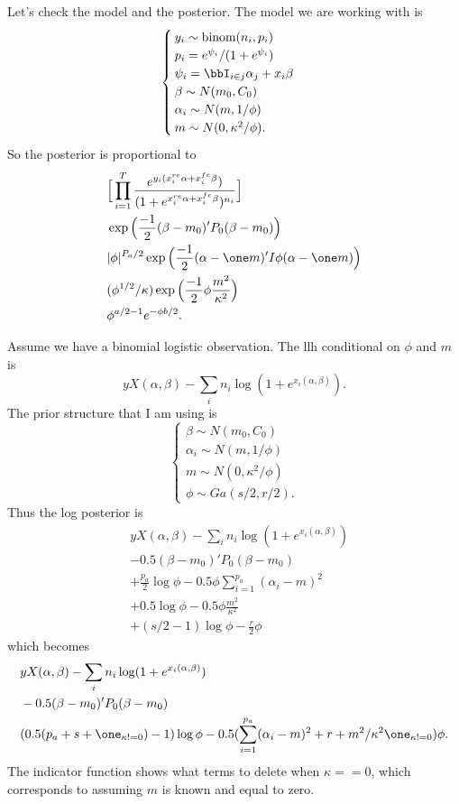 \documentclass[]{article}
\begin{document}
Let's check the model and the posterior.  The model we are working with is
\[
\begin{cases}
y_i \sim \text{binom}(n_i, p_i) \\
p_i = e^{\psi_i} / (1 + e^{\psi_i}) \\
\psi_i = \bbI_{i \in j} \alpha_j + x_i \beta \\
\beta \sim N(m_0, C_0) \\
\alpha_i \sim N(m, 1/\phi) \\
m \sim N(0, \kappa^2 / \phi).
\end{cases}
\]
So the posterior is proportional to
\begin{align*}
& \Big[ \prod_{i=1}^T \frac{{e^{y_i (x_i^{re} \alpha + x_i^{fe} \beta})}}
  {(1+e^{x_i^{re} \alpha + x_i^{fe} \beta})^{n_i}} \Big] \\
& \exp \Big( \frac{-1}{2} (\beta-m_0)' P_0 (\beta-m_0) \Big) \\
& |\phi|^{P_a/2} \exp \Big( \frac{-1}{2} (\alpha - \one m)' I \phi (\alpha -
\one m) \Big) \\
& (\phi^{1/2} / \kappa) \exp \Big( \frac{-1}{2} \phi \frac{m^2}{\kappa^2} \Big) \\
& \phi^{a/2-1} e^{- \phi b / 2}.
\end{align*}

Assume we have a binomial logistic observation.  The llh conditional on $\phi$
and $m$ is
\[
y X (\alpha, \beta) - \sum_i n_i \log (1 + e^{x_i (\alpha, \beta)}).
\]
The prior structure that I am using is
\[
\begin{cases}
\beta \sim N(m_0, C_0) \\
\alpha_i \sim N(m, 1/\phi) \\
m \sim N(0, \kappa^2 / \phi) \\
\phi \sim Ga(s/2, r/2).
\end{cases}
\]
Thus the log posterior is
\begin{align*}
& y X (\alpha, \beta) - \sum_i n_i \log (1 + e^{x_i (\alpha, \beta)}) \\
& - 0.5 (\beta - m_0)' P_0 (\beta - m_0) \\
& + \frac{p_a}{2} \log \phi - 0.5 \phi \sum_{i=1}^{p_a} (\alpha_i - m)^2 \\
& + 0.5 \log \phi - 0.5 \phi \frac{m^2}{\kappa^2} \\
& + (s/2 - 1) \log \phi - \frac{r}{2} \phi
\end{align*}
which becomes
\begin{align*}
& y X (\alpha, \beta) - \sum_i n_i \log (1 + e^{x_i (\alpha, \beta)}) \\
& - 0.5 (\beta - m_0)' P_0 (\beta - m_0) \\
& (0.5 (p_a + s + \one_{\kappa != 0}) - 1) \log \phi - 0.5 (\sum_{i=1}^{p_a}
(\alpha_i - m)^2 + r + m^2 / \kappa^2 \one_{\kappa != 0}) \phi.
\end{align*}
The indicator function shows what terms to delete when $\kappa == 0$, which
corresponds to assuming $m$ is known and equal to zero.
\end{document}
